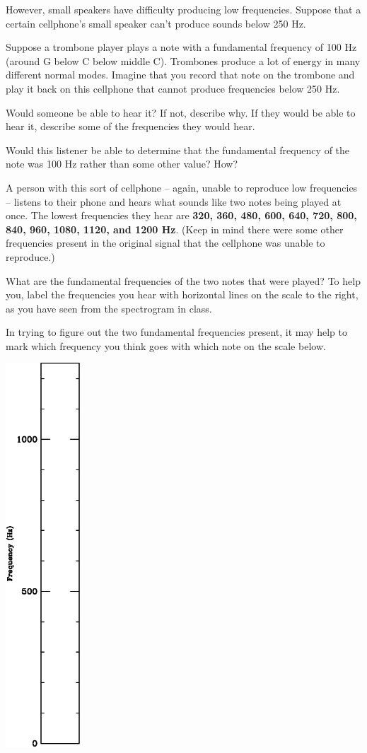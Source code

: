 \documentclass[12pt]{article}
\begin{document}
However, small speakers have difficulty producing low frequencies. Suppose that a certain cellphone's small speaker can't produce sounds below 250 Hz.

Suppose a trombone player plays a note with a fundamental frequency of 100 Hz (around G below C below middle C). Trombones produce a lot of energy in many different normal modes. Imagine that you record that note on the trombone and play it back on this cellphone that cannot produce frequencies below 250 Hz. 

Would someone be able to hear it? If not, describe why. If they would be able to hear it, describe some of the frequencies they would hear.

\vspace{1.5in}

Would this listener be able to determine that the fundamental frequency of the note was 100 Hz rather than some other value? How?

\vspace{1.5in}

\newpage

A person with this sort of cellphone -- again, unable to reproduce low frequencies -- listens to their phone and hears what sounds like two notes being played at once. The lowest frequencies they hear are {\bf 320, 360, 480, 600, 640, 720, 800, 840, 960, 1080, 1120, and 1200 Hz}. (Keep in mind there were some other frequencies present in the original signal that the cellphone was unable to reproduce.)

What are the fundamental frequencies of the two notes that were played? To help you, label the frequencies you hear with horizontal lines on the scale to the right, as you have seen from the spectrogram in class.

In trying to figure out the two fundamental frequencies present, it may help to mark which frequency you think goes with which note on the scale below.

\includegraphics[width=1.1in]{scale.pdf}


 
\end{document}
